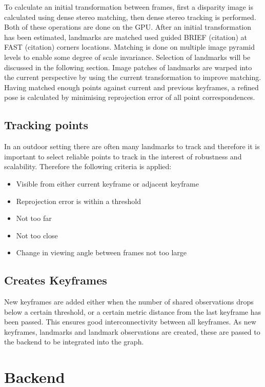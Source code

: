 To calculate an initial transformation between frames, first a disparity image is calculated using
dense stereo matching, then dense stereo tracking is performed.  Both of these operations are done
on the GPU.  After an initial transformation has been estimated, landmarks are matched used
guided BRIEF (citation) at FAST (citation) corners locations.  Matching is done on multiple
image pyramid levels to enable some degree of scale invariance. Selection of landmarks will be
discussed in the following section.  Image patches of landmarks are warped into the current
perspective by using the current transformation to improve matching. Having matched enough points
against current and previous keyframes, a refined pose is calculated by minimising reprojection
error of all point correspondences.

\subsection{Tracking points}

In an outdoor setting there are often many landmarks to track and therefore it is important to
select reliable points to track in the interest of robustness and scalability.  Therefore the
following criteria is applied:
\begin{itemize}
 \setlength{\itemsep}{0cm}%
 \setlength{\parskip}{0cm}%
 \item Visible from either current keyframe or adjacent keyframe
 \item Reprojection error is within a threshold
 \item Not too far
 \item Not too close
 \item Change in viewing angle between frames not too large
\end{itemize}

\subsection{Creates Keyframes}

New keyframes are added either when the number of shared observations drops below a certain
threshold, or a certain metric distance from the last keyframe has been passed.  This ensures good
interconnectivity between all keyframes.  As new keyframes, landmarks and landmark observations are
created, these are passed to the backend to be integrated into the graph.

\section{Backend}
\label{sec:scavislam_backend}

